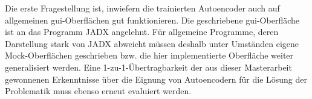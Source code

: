 Die erste Fragestellung ist, inwiefern die trainierten Autoencoder auch auf allgemeinen \gls{gui}-Oberflächen gut funktionieren. Die geschriebene \gls{gui}-Oberfläche ist an das Programm JADX angelehnt. Für allgemeine Programme, deren Darstellung stark von JADX abweicht müssen deshalb unter Umständen eigene Mock-Oberflächen geschrieben bzw. die hier implementierte Oberfläche weiter generalisiert werden. Eine 1-zu-1-Übertragbarkeit der aus dieser Masterarbeit gewonnenen Erkenntnisse über die Eignung von Autoencodern für die Lösung der Problematik muss ebenso erneut evaluiert werden.
